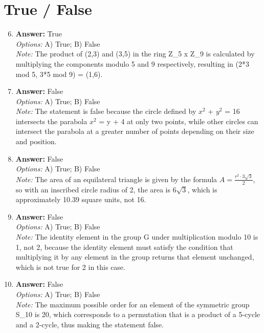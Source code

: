 \documentclass[12pt]{article}
\begin{document}
\section*{True / False}
\begin{enumerate}[label=\arabic*.]
\setcounter{enumi}{5}
\item \textbf{Answer:} True
\\ \textit{Options:} A) True; B) False
\\ \textit{Note:} The product of (2,3) and (3,5) in the ring Z\_5 x Z\_9 is calculated by multiplying the components modulo 5 and 9 respectively, resulting in (2*3 mod 5, 3*5 mod 9) = (1,6).
\item \textbf{Answer:} False
\\ \textit{Options:} A) True; B) False
\\ \textit{Note:} The statement is false because the circle defined by $x^2$ + $y^2$ = 16 intersects the parabola $x^2$ = y + 4 at only two points, while other circles can intersect the parabola at a greater number of points depending on their size and position.
\item \textbf{Answer:} False
\\ \textit{Options:} A) True; B) False
\\ \textit{Note:} The area of an equilateral triangle is given by the formula \( A = \frac{r^2 \cdot 3\sqrt{3}}{2} \), so with an inscribed circle radius of 2, the area is \( 6\sqrt{3} \), which is approximately 10.39 square units, not 16.
\item \textbf{Answer:} False
\\ \textit{Options:} A) True; B) False
\\ \textit{Note:} The identity element in the group G under multiplication modulo 10 is 1, not 2, because the identity element must satisfy the condition that multiplying it by any element in the group returns that element unchanged, which is not true for 2 in this case.
\item \textbf{Answer:} False
\\ \textit{Options:} A) True; B) False
\\ \textit{Note:} The maximum possible order for an element of the symmetric group S\_10 is 20, which corresponds to a permutation that is a product of a 5-cycle and a 2-cycle, thus making the statement false.
\end{enumerate}
\end{document}
